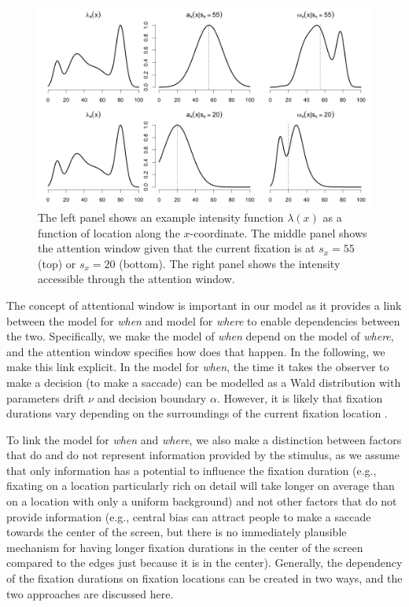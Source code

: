 \documentclass{article}
\begin{document}
\begin{figure}
    \centering
    \includegraphics[width=\linewidth]{figures/attention_window.png}
    \caption{The left panel shows an example intensity function $\lambda(x)$ as a function of location along the $x$-coordinate. The middle panel shows the attention window given that the current fixation is at $s_x = 55$ (top) or $s_x=20$ (bottom). The right panel shows the intensity accessible through the attention window.}
    \label{fig:attention_window}
\end{figure}

The concept of attentional window is important in our model as it provides a link between the model for \textit{when} and model for \textit{where} to enable dependencies between the two. Specifically, we make the model of \textit{when} depend on the model of \textit{where}, and the attention window specifies how does that happen. In the following, we make this link explicit. In the model for \textit{when}, the time it takes the observer to make a decision (to make a saccade) can be modelled as a Wald distribution with parameters drift $\nu$ and decision boundary $\alpha$. However, it is likely that fixation durations vary depending on the surroundings of the current fixation location \citep{einhauser2020fixation,nuthmann2010crisp,nuthmann2017fixation_durations}. 

To link the model for \textit{when} and \textit{where}, we also make a distinction between factors that do and do not represent information provided by the stimulus, as we assume that only information has a potential to influence the fixation duration (e.g., fixating on a location particularly rich on detail will take longer on average than on a location with only a uniform background) and not other factors that do not provide information (e.g., central bias can attract people to make a saccade towards the center of the screen, but there is no immediately plausible mechanism for having longer fixation durations in the center of the screen compared to the edges just because it is in the center). Generally, the dependency of the fixation durations on fixation locations can be created in two ways, and the two approaches are discussed here. 
\end{document}
